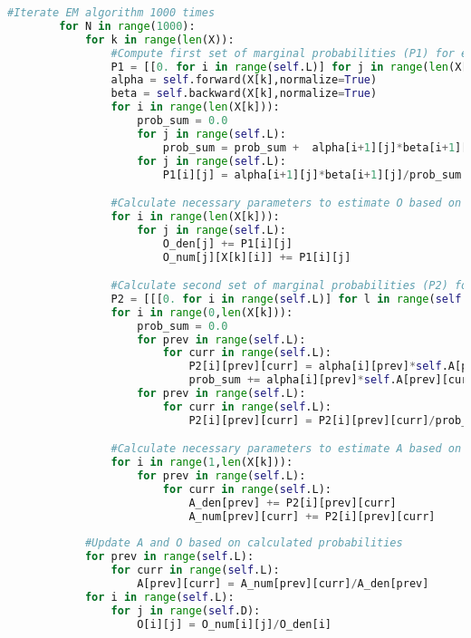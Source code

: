 \begin{lstlisting}[language=Python]
        #Iterate EM algorithm 1000 times
        for N in range(1000):
            for k in range(len(X)):
                #Compute first set of marginal probabilities (P1) for each sequence in X
                P1 = [[0. for i in range(self.L)] for j in range(len(X[k]))]
                alpha = self.forward(X[k],normalize=True)
                beta = self.backward(X[k],normalize=True)
                for i in range(len(X[k])):
                    prob_sum = 0.0
                    for j in range(self.L):
                        prob_sum = prob_sum +  alpha[i+1][j]*beta[i+1][j]
                    for j in range(self.L):
                        P1[i][j] = alpha[i+1][j]*beta[i+1][j]/prob_sum

                #Calculate necessary parameters to estimate O based on marginal probabilities
                for i in range(len(X[k])):
                    for j in range(self.L):
                        O_den[j] += P1[i][j]
                        O_num[j][X[k][i]] += P1[i][j]

                #Calculate second set of marginal probabilities (P2) for each sequence in X
                P2 = [[[0. for i in range(self.L)] for l in range(self.L)] for j in range(len(X[k]))]
                for i in range(0,len(X[k])):
                    prob_sum = 0.0
                    for prev in range(self.L):
                        for curr in range(self.L):
                            P2[i][prev][curr] = alpha[i][prev]*self.A[prev][curr]*self.O[curr][X[k][i]]*beta[i+1][curr]
                            prob_sum += alpha[i][prev]*self.A[prev][curr]*self.O[curr][X[k][i]]*beta[i+1][curr]
                    for prev in range(self.L):
                        for curr in range(self.L):
                            P2[i][prev][curr] = P2[i][prev][curr]/prob_sum

                #Calculate necessary parameters to estimate A based on marginal probabilities
                for i in range(1,len(X[k])):
                    for prev in range(self.L):
                        for curr in range(self.L):
                            A_den[prev] += P2[i][prev][curr]
                            A_num[prev][curr] += P2[i][prev][curr]
                        
            #Update A and O based on calculated probabilities
            for prev in range(self.L):
                for curr in range(self.L):
                    A[prev][curr] = A_num[prev][curr]/A_den[prev]
            for i in range(self.L):
                for j in range(self.D):
                    O[i][j] = O_num[i][j]/O_den[i]


\end{lstlisting}
